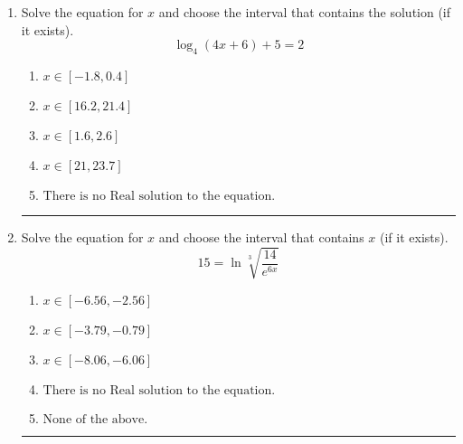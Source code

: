 \documentclass[14pt]{extbook}
\newcommand{\litem}[1]{\item#1\hspace*{-1cm}\rule{\textwidth}{0.4pt}}
\begin{document}
\begin{enumerate}
{\begin{enumerate}[label=\Alph*.]
\end{enumerate} }
\litem{
Solve the equation for $x$ and choose the interval that contains the solution (if it exists).\[ \log_{4}{(4x+6)}+5 = 2 \]\begin{enumerate}[label=\Alph*.]
\item \( x \in [-1.8, 0.4] \)
\item \( x \in [16.2, 21.4] \)
\item \( x \in [1.6, 2.6] \)
\item \( x \in [21, 23.7] \)
\item \( \text{There is no Real solution to the equation.} \)

\end{enumerate} }
\litem{
 Solve the equation for $x$ and choose the interval that contains $x$ (if it exists).\[  15 = \ln{\sqrt[3]{\frac{14}{e^{6x}}}} \]\begin{enumerate}[label=\Alph*.]
\item \( x \in [-6.56, -2.56] \)
\item \( x \in [-3.79, -0.79] \)
\item \( x \in [-8.06, -6.06] \)
\item \( \text{There is no Real solution to the equation.} \)
\item \( \text{None of the above.} \)

\end{enumerate} }
\end{enumerate}
\end{document}

